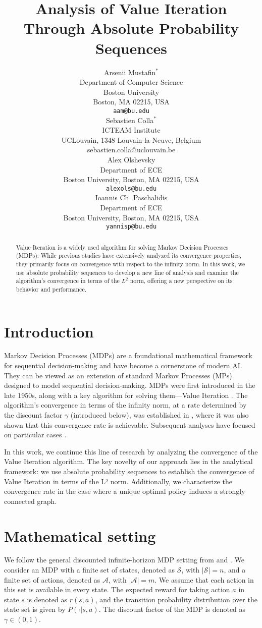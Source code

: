 \documentclass{article}
\title{Analysis of Value Iteration Through Absolute Probability Sequences}
\author{%
  Arsenii Mustafin$^*$  \\
  Department of Computer Science\\
  Boston University\\
  Boston, MA 02215, USA \\
  \texttt{aam@bu.edu} \\
  \And
  Sebastien Colla$^*$ \\
  ICTEAM Institute \\
  UCLouvain, 1348 Louvain-la-Neuve, Belgium \\
  sebastien.colla@uclouvain.be \\
   \AND
   Alex Olshevsky \\
   Department of ECE \\
   Boston University, Boston, MA 02215, USA \\
   \texttt{alexols@bu.edu} \\
   \And
   Ioannis Ch. Paschalidis \\
   Department of ECE \\
   Boston University, Boston, MA 02215, USA \\
   \texttt{yannisp@bu.edu} \\
}
\begin{document}
\maketitle
\begin{abstract}
Value Iteration is a widely used algorithm for solving Markov Decision Processes (MDPs). While previous studies have extensively analyzed its convergence properties, they primarily focus on convergence with respect to the infinity norm. In this work, we use absolute probability sequences to develop a new line of analysis and examine the algorithm’s convergence in terms of the $L^2$ norm, offering a new perspective on its behavior and performance.
\end{abstract}

\section{Introduction} \label{sec:intro}

Markov Decision Processes (MDPs) are a foundational mathematical framework for sequential decision-making and have become a cornerstone of modern AI. They can be viewed as an extension of standard Markov Processes (MPs) designed to model sequential decision-making. MDPs were first introduced in the late 1950s, along with a key algorithm for solving them—Value Iteration \citep{bellmandp}. The algorithm's convergence in terms of the infinity norm, at a rate determined by the discount factor $\gamma$ (introduced below), was established in \citep{howard1960dynamic}, where it was also shown that this convergence rate is achievable. Subsequent analyses have focused on particular cases \citep{puterman1990markov, feinberg2014value}.

In this work, we continue this line of research by analyzing the convergence of the Value Iteration algorithm. The key novelty of our approach lies in the analytical framework: we use absolute probability sequences to establish the convergence of Value Iteration in terms of the L² norm. Additionally, we characterize the convergence rate in the case where a unique optimal policy induces a strongly connected graph.

\section{Mathematical setting} \label{sec:setting}

We follow the general discounted infinite-horizon MDP setting from \cite{puterman2014markov} and \cite{sutton2018reinforcement}. We consider an MDP with a finite set of states, denoted as $\mathcal{S}$, with $|\mathcal{S}| = n$, and a finite set of actions, denoted as $\mathcal{A}$, with $|\mathcal{A}| = m$. We assume that each action in this set is available in every state. The expected reward for taking action $a$ in state $s$ is denoted as $r(s,a)$, and the transition probability distribution over the state set is given by $P(\cdot | s,a)$. The discount factor of the MDP is denoted as $\gamma \in (0,1)$.  
\end{document}
